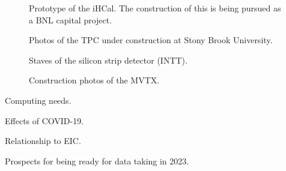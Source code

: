 \begin{figure}[!hbt]
 \begin{center}
        \caption{\label{fig:ihcal}Prototype of the iHCal.  The
        construction of this is being pursued as a BNL capital project.}
 \end{center}
\end{figure}

\begin{figure}[!hbt]
 \begin{center}
        \caption{\label{fig:tpc}Photos of the TPC under construction
        at Stony Brook University.}
 \end{center}
\end{figure}

\begin{figure}[!hbt]
 \begin{center}
        \caption{\label{fig:intt}Staves of the silicon strip detector (INTT).}
 \end{center}
\end{figure}

\begin{figure}[!hbt]
 \begin{center}
        \caption{\label{fig:mvtx}Construction photos of the MVTX.}
 \end{center}
\end{figure}


Computing needs.

Effects of COVID-19.

Relationship to EIC.

Prospects for being ready for data taking in 2023.

